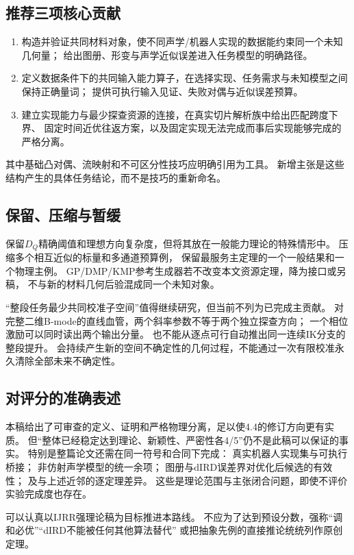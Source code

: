 \documentclass[11pt,a4paper]{article}
\numberwithin{equation}{section}
\theoremstyle{definition}
\begin{document}
\subsection{推荐三项核心贡献}
\begin{enumerate}
 \item 构造并验证共同材料对象，使不同声学/机器人实现的数据能约束同一个未知几何量；
       给出图册、形变与声学近似误差进入任务模型的明确路径。
 \item 定义数据条件下的共同输入能力算子，在选择实现、任务需求与未知模型之间保持正确量词；
       提供可执行输入见证、失败对偶与近似误差预算。
 \item 建立实现能力与最少探查资源的连接，在真实切片解析族中给出匹配跨度下界、
       固定时间近优往返方案，以及固定实现无法完成而事后实现能够完成的严格分离。
\end{enumerate}
其中基础凸对偶、流映射和不可区分性技巧应明确引用为工具。
新增主张是这些结构产生的具体任务结论，而不是技巧的重新命名。

\subsection{保留、压缩与暂缓}
保留$D_Q$精确阈值和理想方向复杂度，但将其放在一般能力理论的特殊情形中。
压缩多个相互近似的标量和多通道预算例，
保留最服务主定理的一个一般结果和一个物理主例。
GP/DMP/KMP参考生成器若不改变本文资源定理，降为接口或另稿，
不与新的材料几何后验混成同一个未知对象。

“整段任务最少共同校准子空间”值得继续研究，但当前不列为已完成主贡献。
对完整二维B-mode的直线血管，两个斜率参数不等于两个独立探查方向；
一个相位激励可以同时读出两个输出分量。
也不能从逐点可行自动推出同一连续IK分支的整段提升。
会持续产生新的空间不确定性的几何过程，不能通过一次有限校准永久清除全部未来不确定性。

\subsection{对评分的准确表述}
本稿给出了可审查的定义、证明和严格物理分离，足以使4.4的修订方向更有实质。
但“整体已经稳定达到理论、新颖性、严密性各4/5”仍不是此稿可以保证的事实。
特别是整篇论文还需在同一符号和合同下完成：
真实机器人实现集与可执行桥接；
非仿射声学模型的统一余项；
图册与dIRD误差界对优化后候选的有效性；
及与上述近邻的逐定理差异。
这些是理论范围与主张闭合问题，即使不评价实验完成度也存在。

可以认真以IJRR强理论稿为目标推进本路线。
不应为了达到预设分数，强称“调和必优”“dIRD不能被任何其他算法替代”
或把抽象先例的直接推论统统列作原创定理。
\end{document}
